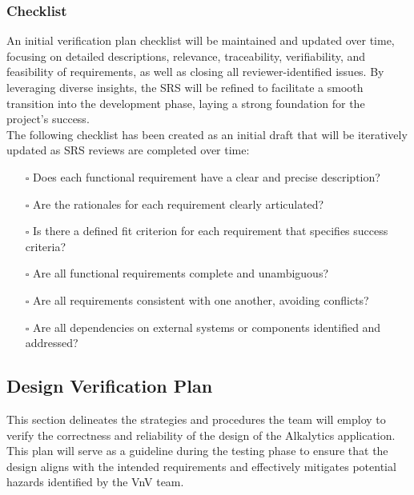 \documentclass[12pt, titlepage]{article}
\begin{document}
\subsubsection{Checklist}
An initial verification plan checklist will be maintained and updated over time, focusing on detailed
descriptions, relevance, traceability, verifiability, and feasibility of requirements, as well as
closing all reviewer-identified issues. By leveraging diverse insights, the SRS will be refined
to facilitate a smooth transition into the development phase, laying a strong foundation for the
project's success.\\
\newline
The following checklist has been created as an initial draft that will be iteratively updated as SRS
reviews are completed over time:
\begin{itemize}
  \item[$\square$] Does each functional requirement have a clear and precise description?
  \item[$\square$] Are the rationales for each requirement clearly articulated?
  \item[$\square$] Is there a defined fit criterion for each requirement that specifies success criteria?
  \item[$\square$] Are all functional requirements complete and unambiguous?
  \item[$\square$] Are all requirements consistent with one another, avoiding conflicts?
  \item[$\square$] Are all dependencies on external systems or components identified and addressed?
\end{itemize}

\subsection{Design Verification Plan}
This section delineates the strategies and procedures the team will employ to verify the
correctness and reliability of the design of the Alkalytics application. This plan will
serve as a guideline during the testing phase to ensure that the design aligns with the
intended requirements and effectively mitigates potential hazards identified by the VnV team.
\end{document}
